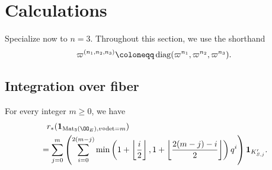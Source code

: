 \section{Calculations}
Specialize now to $n=3$.
Throughout this section, we use the shorthand
\[ \varpi^{(n_1, n_2, n_3)} \coloneqq \diag(\varpi^{n_1}, \varpi^{n_2}, \varpi^{n_3}). \]

\subsection{Integration over fiber}
\begin{proposition}
  For every integer $m \ge 0$, we have
  \begin{align*}
    &\phantom= r_\ast(\mathbf{1}_{\Mat_3(\OO_E), v\circ\det=m}) \\
    &= \sum_{j=0}^m \left(
      \sum_{i=0}^{2(m-j)} \min \left( 1 + \left\lfloor \frac i2 \right\rfloor,
        1 + \left\lfloor \frac{2(m-j)-i}{2} \right\rfloor \right) q^i \right)
        \mathbf{1}_{K'_{S,j}}.
  \end{align*}
\end{proposition}
